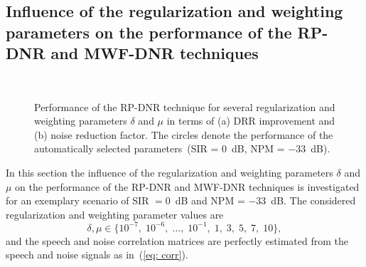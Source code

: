 \documentclass[draftcls,onecolumn,11pt]{IEEEtran}
\begin{document}
\subsection{Influence of the regularization and weighting parameters on the performance of the RP-DNR and MWF-DNR techniques}
\label{sec: expb}
\begin{figure}[b!]
\centering
\hbox{\subfloat[\label{fig: drr_rpdnr}]{%

}
\subfloat[\label{fig: nr_rpdnr}]{%

}}
\caption{Performance of the RP-DNR technique for several regularization and weighting parameters $\delta$ and $\mu$ in terms of (a) DRR improvement  and (b) noise reduction factor. The circles denote the performance of the automatically selected parameters~(SIR = $0$~dB, NPM = $-33$~dB).}
\label{fig: rpdnr}
\end{figure}
In this section the influence of the regularization and weighting parameters $\delta$ and $\mu$ on the performance of the RP-DNR and MWF-DNR techniques is investigated for an exemplary scenario of SIR $= 0$~dB and NPM = $-33$~dB.
The considered regularization and weighting parameter values are
\begin{equation}
\delta, \mu \in \{10^{-7}, \; 10^{-6}, \; \ldots, \; 10^{-1}, \; 1, \; 3, \; 5, \; 7, \; 10\},
\end{equation}
and the speech and noise correlation matrices are perfectly estimated from the speech and noise signals as in~(\ref{eq: corr}).
\end{document}
